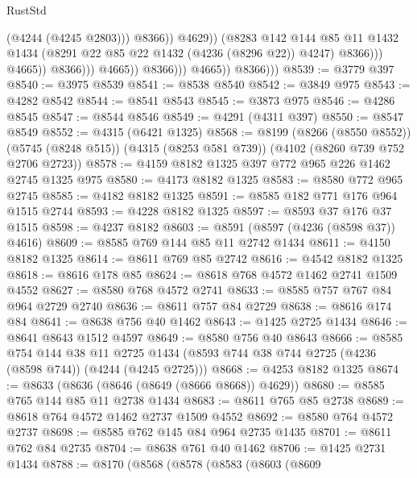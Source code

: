 \begin{lexlean}{RustStd}
\begin{coremodule}
                                                (@4244 (@4245 @2803)))
                                              @8366))
                                          @4629))
                                      (@8283
                                        @142
                                        @144
                                        @85
                                        @11
                                        @1432
                                        @1434
                                        (@8291 @22 @85 @22 @1432 (@4236 (@8296 @22)) @4247)
                                        @8366)))
                                  @4665))
                              @8366)))
                        @4665))
                    @8366)))
              @4665))
          @8366)))
@8539 := @3779 @397
@8540 := @3975 @8539
@8541 := @8538 @8540
@8542 := @3849 @975
@8543 := @4282 @8542
@8544 := @8541 @8543
@8545 := @3873 @975
@8546 := @4286 @8545
@8547 := @8544 @8546
@8549 := @4291 (@4311 @397)
@8550 := @8547 @8549
@8552 := @4315 (@6421 @1325)
@8568 := @8199
    (@8266 (@8550 @8552))
    (@5745 (@8248 @515))
    (@4315 (@8253 @581 @739))
    (@4102 (@8260 @739 @752 @2706 @2723))
@8578 := @4159 @8182 @1325 @397 @772 @965 @226 @1462 @2745 @1325 @975
@8580 := @4173 @8182 @1325
@8583 := @8580 @772 @965 @2745
@8585 := @4182 @8182 @1325
@8591 := @8585 @182 @771 @176 @964 @1515 @2744
@8593 := @4228 @8182 @1325
@8597 := @8593 @37 @176 @37 @1515
@8598 := @4237 @8182
@8603 := @8591 (@8597 (@4236 (@8598 @37)) @4616)
@8609 := @8585 @769 @144 @85 @11 @2742 @1434
@8611 := @4150 @8182 @1325
@8614 := @8611 @769 @85 @2742
@8616 := @4542 @8182 @1325
@8618 := @8616 @178 @85
@8624 := @8618 @768 @4572 @1462 @2741 @1509 @4552
@8627 := @8580 @768 @4572 @2741
@8633 := @8585 @757 @767 @84 @964 @2729 @2740
@8636 := @8611 @757 @84 @2729
@8638 := @8616 @174 @84
@8641 := @8638 @756 @40 @1462
@8643 := @1425 @2725 @1434
@8646 := @8641 @8643 @1512 @4597
@8649 := @8580 @756 @40 @8643
@8666 := @8585
    @754
    @144
    @38
    @11
    @2725
    @1434
    (@8593 @744 @38 @744 @2725 (@4236 (@8598 @744)) (@4244 (@4245 @2725)))
@8668 := @4253 @8182 @1325
@8674 := @8633 (@8636 (@8646 (@8649 (@8666 @8668)) @4629))
@8680 := @8585 @765 @144 @85 @11 @2738 @1434
@8683 := @8611 @765 @85 @2738
@8689 := @8618 @764 @4572 @1462 @2737 @1509 @4552
@8692 := @8580 @764 @4572 @2737
@8698 := @8585 @762 @145 @84 @964 @2735 @1435
@8701 := @8611 @762 @84 @2735
@8704 := @8638 @761 @40 @1462
@8706 := @1425 @2731 @1434
@8788 := @8170
    (@8568
      (@8578
        (@8583
          (@8603
            (@8609

\end{coremodule}
\end{lexlean}
